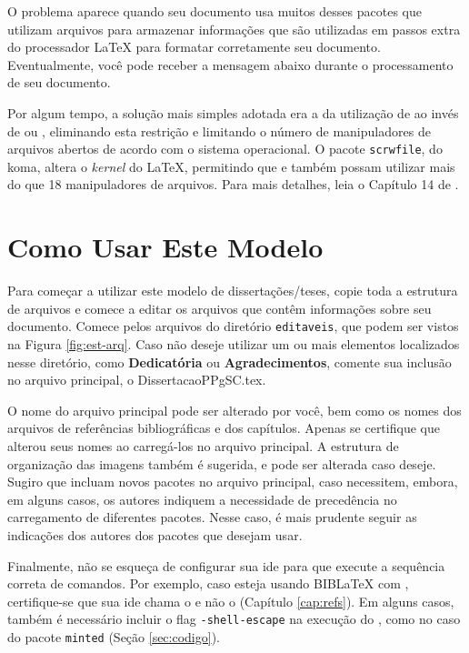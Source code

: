 O problema aparece quando seu documento usa muitos desses pacotes que utilizam arquivos para armazenar informações que são utilizadas em passos extra do processador \LaTeX{} para formatar corretamente seu documento. Eventualmente, você pode receber a mensagem abaixo durante o processamento de seu documento. 


Por algum tempo, a solução mais simples adotada era a da utilização de  ao invés de  ou , eliminando esta restrição e limitando o número de manipuladores de arquivos abertos de acordo com o sistema operacional. O pacote \texttt{scrwfile}, do \gls{koma}, altera o \textit{kernel} do \LaTeX{}, permitindo que  e  também possam utilizar mais do que 18 manipuladores de arquivos. Para mais detalhes, leia o Capítulo 14 de \parencite{koma}.

\section{Como Usar Este Modelo}

Para começar a utilizar este modelo de dissertações/teses, copie toda a estrutura de arquivos e comece a editar os arquivos que contêm informações sobre seu documento. Comece pelos arquivos do diretório \texttt{editaveis}, que podem ser vistos na Figura \ref{fig:est-arq}. Caso não deseje utilizar um ou mais elementos localizados nesse diretório, como \textbf{Dedicatória} ou \textbf{Agradecimentos}, comente sua inclusão no arquivo principal, o DissertacaoPPgSC.tex. 

O nome do arquivo principal pode ser alterado por você, bem como os nomes dos arquivos de referências bibliográficas e dos capítulos. Apenas se certifique que alterou seus nomes ao carregá-los no arquivo principal. A estrutura de organização das imagens também é sugerida, e pode ser alterada caso deseje. Sugiro que incluam novos pacotes no arquivo principal, caso necessitem, embora, em alguns casos, os autores indiquem a necessidade de precedência no carregamento de diferentes pacotes. Nesse caso, é mais prudente seguir as indicações dos autores dos pacotes que desejam usar.

Finalmente, não se esqueça de configurar sua \gls{ide} para que execute a sequência correta de comandos. Por exemplo, caso esteja usando BIB\LaTeX{} com , certifique-se que sua \gls{ide} chama o  e não o \BibTeX{} (Capítulo \ref{cap:refs}). Em alguns casos, também é necessário incluir o flag \texttt{-shell-escape} na execução do , como no caso do pacote \texttt{minted} (Seção \ref{sec:codigo}).


